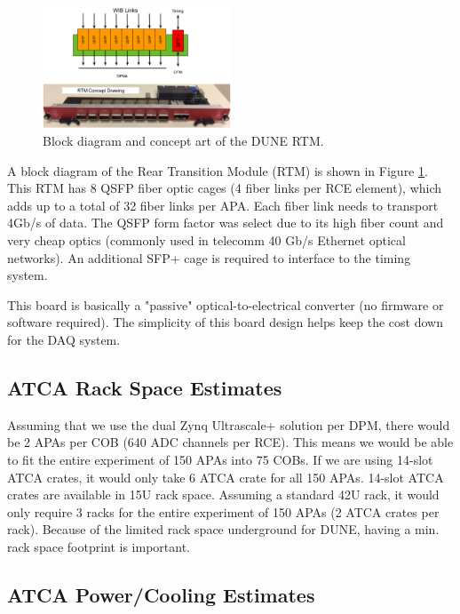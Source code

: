 \begin{figure}[tb]
\centering
\includegraphics[width=0.5\textwidth]{images/RTM_block_diagram.png}
\caption{\label{fig:RTM_block_diagram}Block diagram and concept art of the DUNE RTM.}
\end{figure}

A block diagram of the Rear Transition Module (RTM) is shown in Figure \ref{fig:RTM_block_diagram}. This RTM has 8 QSFP fiber optic cages (4 fiber links per RCE element), which adds up to a total of 32 fiber links per APA.  Each fiber link needs to transport 4Gb/s of data.  The QSFP form factor was select due to its high fiber count and very cheap optics (commonly used in telecomm 40 Gb/s Ethernet optical networks). An additional SFP+ cage is required to interface to the timing system. 

This board is basically a "passive" optical-to-electrical converter (no firmware or software required).  The simplicity of this board design helps keep the cost down for the DAQ system. 

\subsection{ATCA Rack Space Estimates}

Assuming that we use the dual Zynq Ultrascale+ solution per DPM, there would be 2 APAs per COB (640 ADC channels per RCE). This means we would be able to fit the entire experiment of 150 APAs into 75 COBs.  If we are using 14-slot ATCA crates, it would only take 6 ATCA crate for all 150 APAs. 14-slot ATCA crates are available in 15U rack space. Assuming a standard 42U rack, it would only require 3 racks for the entire experiment of 150 APAs (2 ATCA crates per rack). Because of the limited rack space underground for DUNE, having a min. rack space footprint is important.

\subsection{ATCA Power/Cooling Estimates}

